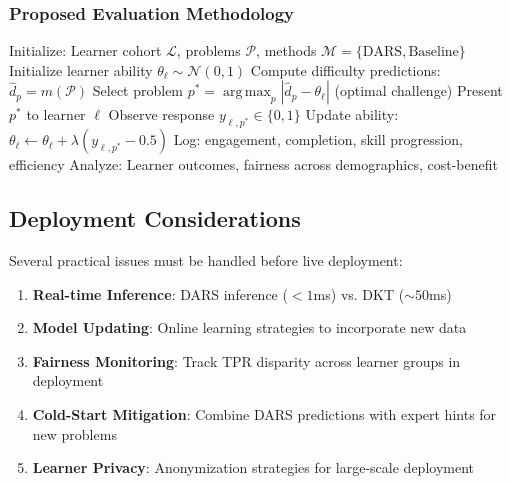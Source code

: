 \documentclass[conference]{IEEEtran}
\newcommand{\argmax}{\operatorname*{arg\,max}}
\begin{document}
\subsubsection{Proposed Evaluation Methodology}

\begin{algorithm}[h]
\caption{Live Adaptive Assessment Evaluation}
\begin{algorithmic}[1]
\STATE Initialize: Learner cohort $\mathcal{L}$, problems $\mathcal{P}$, methods $\mathcal{M} = \{\text{DARS}, \text{Baseline}\}$
        \STATE Initialize learner ability $\theta_\ell \sim \mathcal{N}(0,1)$
            \STATE Compute difficulty predictions: $\hat{d}_p = m(\mathcal{P})$
            \STATE Select problem $p^* = \argmax_p |\hat{d}_p - \theta_\ell|$ (optimal challenge)
            \STATE Present $p^*$ to learner $\ell$
            \STATE Observe response $y_{\ell,p^*} \in \{0,1\}$
            \STATE Update ability: $\theta_\ell \leftarrow \theta_\ell + \lambda(y_{\ell,p^*} - 0.5)$
            \STATE Log: engagement, completion, skill progression, efficiency
        \ENDFOR
    \ENDFOR
\ENDFOR
\STATE Analyze: Learner outcomes, fairness across demographics, cost-benefit
\end{algorithmic}
\end{algorithm}

\subsection{Deployment Considerations}

Several practical issues must be handled before live deployment:

\begin{enumerate}
    \item \textbf{Real-time Inference}: DARS inference ($< 1$ms) vs. DKT ($\sim 50$ms)
    \item \textbf{Model Updating}: Online learning strategies to incorporate new data
    \item \textbf{Fairness Monitoring}: Track TPR disparity across learner groups in deployment
    \item \textbf{Cold-Start Mitigation}: Combine DARS predictions with expert hints for new problems
    \item \textbf{Learner Privacy}: Anonymization strategies for large-scale deployment
\end{enumerate}
\end{document}
